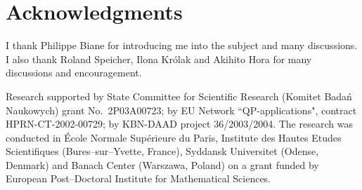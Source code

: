 \documentclass[12pt,dvips]{amsart}
\numberwithin{equation}{section} \numberwithin{figure}{section}
\theoremstyle{plain}
\theoremstyle{definition}
\theoremstyle{remark}
\begin{document}
\section{Acknowledgments}
I thank Philippe Biane for introducing me into the subject and many
discussions. I also thank Roland Speicher, Ilona Kr\'olak and
Akihito Hora for many discussions and encouragement.

Research supported by State Committee for Scientific Research
(Komitet Bada\'n Naukowych) grant No.\ 2P03A00723; by EU Network
``QP-applications", contract HPRN-CT-2002-00729; by KBN-DAAD project
36/2003/2004. The research was conducted in \'Ecole Normale
Sup\'erieure du Paris, Institute des Hautes Etudes Scientifiques
(Bures--sur--Yvette, France), Syddansk Universitet (Odense, Denmark)
and Banach Center (Warszawa, Poland) on a grant funded by European
Post--Doctoral Institute for Mathematical Sciences.



%
%



%






%

\end{document}
